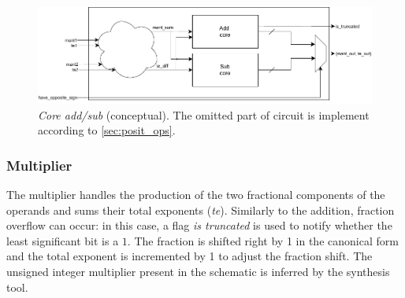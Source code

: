 \begin{figure}
    \centering
    \includegraphics[width=\textwidth]{figures/add-sub-core.drawio.pdf}
    \caption{\textit{Core add/sub} (conceptual). The omitted part of circuit is implement according to \ref{sec:posit_ops}.}
    \label{fig:core_add_sub_schematic_conc}
\end{figure}%






\subsubsection{Multiplier}



The multiplier handles the production of the two fractional components of the operands and sums their total exponents (\textit{te}). Similarly to the addition, fraction overflow can occur: in this case, a flag \textit{is truncated} is used to notify whether the least significant bit is a $1$. The fraction is shifted right by 1 in the canonical form and the total exponent is incremented by 1 to adjust the fraction shift.
The unsigned integer multiplier present in the schematic is inferred by the synthesis tool. 
%





